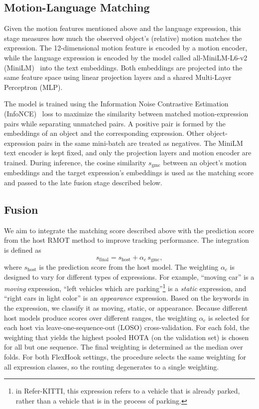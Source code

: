 \documentclass{article}
\begin{document}
\subsection{Motion-Language Matching}
\label{sec:align}
Given the motion features mentioned above and the language expression, this stage measures how much the observed object's (relative) motion matches the expression. The 12-dimensional motion feature is encoded by a motion encoder, while the language expression is encoded by the model called all-MiniLM-L6-v2 (MiniLM)~\cite{sbert} into the text embeddings. Both embeddings are projected into the same feature space using linear projection layers and a shared Multi-Layer Perceptron (MLP).

The model is trained using the Information Noise Contrastive Estimation (InfoNCE)~\cite{infonce} loss to maximize the similarity between matched motion-expression pairs while separating unmatched pairs. A positive pair is formed by the embeddings of an object and the corresponding expression. Other object-expression pairs in the same mini-batch are treated as negatives. The MiniLM text encoder is kept fixed, and only the projection layers and motion encoder are trained. During inference, the cosine similarity $s_{\mathrm{gmc}}$ between an object's motion embeddings and the target expression's embeddings is used as the matching score and passed to the late fusion stage described below.

\subsection{Fusion}
\label{sec:fusion}
We aim to integrate the matching score described above with the prediction score from the host RMOT method to improve tracking performance. The integration is defined as
\begin{equation}
  s_{\mathrm{final}} = s_{\mathrm{host}} + \alpha_{c}\,s_{\mathrm{gmc}},
  \label{eq:fusion}
\end{equation}
where $s_{\mathrm{host}}$ is the prediction score from the host model. The weighting $\alpha_c$ is designed to vary for different types of expressions. For example, \enquote{moving car} is a \emph{moving} expression, \enquote{left vehicles which are parking}\footnote{in Refer-KITTI, this expression refers to a vehicle that is already parked, rather than a vehicle that is in the process of parking.} is a \emph{static} expression, and \enquote{right cars in light color} is an \emph{appearance} expression. Based on the keywords in the expression, we classify it as moving, static, or appearance. Because different host models produce scores over different ranges, the weighting $\alpha_c$ is selected for each host via leave-one-sequence-out (LOSO) cross-validation. For each fold, the weighting that yields the highest pooled HOTA (on the validation set) is chosen for all but one sequence. The final weighting is determined as the median over folds. For both FlexHook settings, the procedure selects the same weighting for all expression classes, so the routing degenerates to a single weighting.
\end{document}

